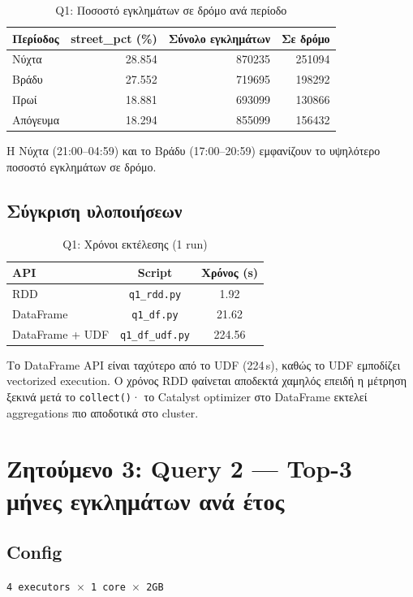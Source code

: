 \documentclass[11pt,a4paper]{article}
\begin{document}
\begin{table}[h]
\centering
\caption{Q1: Ποσοστό εγκλημάτων σε δρόμο ανά περίοδο}
\begin{tabular}{lrrr}
\toprule
Περίοδος & street\_pct (\%) & Σύνολο εγκλημάτων & Σε δρόμο \\
\midrule
Νύχτα     & 28.854 & 870235 & 251094 \\
Βράδυ     & 27.552 & 719695 & 198292 \\
Πρωί      & 18.881 & 693099 & 130866 \\
Απόγευμα  & 18.294 & 855099 & 156432 \\
\bottomrule
\end{tabular}
\end{table}

Η Νύχτα (21:00--04:59) και το Βράδυ (17:00--20:59) εμφανίζουν το υψηλότερο
ποσοστό εγκλημάτων σε δρόμο.

\subsection{Σύγκριση υλοποιήσεων}

\begin{table}[h]
\centering
\caption{Q1: Χρόνοι εκτέλεσης (1 run)}
\begin{tabular}{lcc}
\toprule
API & Script & Χρόνος (s) \\
\midrule
RDD & \texttt{q1\_rdd.py} & 1.92 \\
DataFrame & \texttt{q1\_df.py} & 21.62 \\
DataFrame + UDF & \texttt{q1\_df\_udf.py} & 224.56 \\
\bottomrule
\end{tabular}
\end{table}

Το DataFrame API είναι ταχύτερο από το UDF (224\,s), καθώς το UDF εμποδίζει
vectorized execution. Ο χρόνος RDD φαίνεται αποδεκτά χαμηλός επειδή η μέτρηση
ξεκινά μετά το \texttt{collect()}· το Catalyst optimizer στο DataFrame
εκτελεί aggregations πιο αποδοτικά στο cluster.

\section{Ζητούμενο 3: Query 2 --- Top-3 μήνες εγκλημάτων ανά έτος}

\subsection{Config}
\texttt{4 executors $\times$ 1 core $\times$ 2GB}
\end{document}
